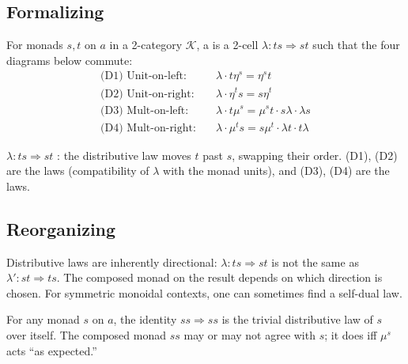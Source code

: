\subsection{Formalizing}

\begin{definition}
\label{def:dist-formal}
For monads $s, t$ on $a$ in a 2-category $\mathcal{K}$, a  is a 2-cell $\lambda : ts \Rightarrow st$ such that the
four diagrams below commute:
\begin{align*}
  \text{(D1) Unit-on-left:} &\quad \lambda \cdot t \eta^s = \eta^s t \\
  \text{(D2) Unit-on-right:} &\quad \lambda \cdot \eta^t s = s \eta^t \\
  \text{(D3) Mult-on-left:} &\quad \lambda \cdot t \mu^s = \mu^s t \cdot s \lambda \cdot \lambda s \\
  \text{(D4) Mult-on-right:} &\quad \lambda \cdot \mu^t s = s \mu^t \cdot \lambda t \cdot t \lambda
\end{align*}
\end{definition}

\begin{howtosay}
$\lambda : ts \Rightarrow st$ : the
distributive law moves $t$ past $s$, swapping their order. (D1), (D2) are
the  laws (compatibility of $\lambda$ with the monad units),
and (D3), (D4) are the  laws.
\end{howtosay}

\subsection{Reorganizing}

\begin{remark}[Symmetry]
Distributive laws are inherently directional: $\lambda : ts \Rightarrow st$
is not the same as $\lambda' : st \Rightarrow ts$. The composed monad on
the result depends on which direction is chosen. For symmetric monoidal
contexts, one can sometimes find a self-dual law.
\end{remark}

\begin{example_thm}
For any monad $s$ on $a$, the identity $s s \Rightarrow s s$ is the trivial
distributive law of $s$ over itself. The composed monad $ss$ may or may not
agree with $s$; it does iff $\mu^s$ acts ``as expected.''
\end{example_thm}


